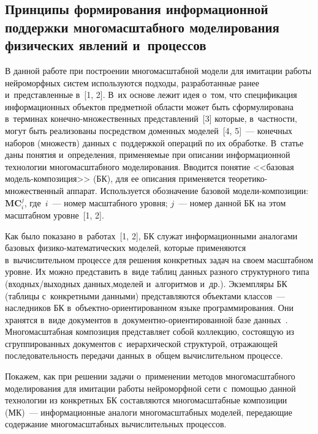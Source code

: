 \begin{multicols}{2}
\section{Принципы формирования информационной поддержки 
многомасштабного моделирования физических явлений 
и~процессов}

    В данной работе при построении многомасштабной модели для имитации 
работы нейроморфных систем используются подходы, разработанные ранее 
и~представленные в~[1, 2]. В~их основе лежит идея о~том, что спецификация 
информационных объектов предметной области может быть сформулирована 
в~терминах 
 ко\-неч\-но-мно\-жест\-вен\-ных представлений~[3] которые, в~част\-ности, могут 
быть реализованы посредством доменных моделей~[4, 5]~--- конечных наборов 
(множеств) данных с~поддержкой операций по их обработке. 
В~\mbox{статье}~\cite{2-ab} даны понятия и~определения, применяемые при описании информационной 
технологии многомасштабного моделирования. Вводится понятие <<базовая 
мод\-ель-ком\-по\-зи\-ция>> (БК), для ее описания применяется 
тео\-ре\-ти\-ко-мно\-жест\-вен\-ный аппарат. Используется обозначение базовой  
мо\-де\-ли-ком\-по\-зи\-ции: $\mathbf{MC}_i^j$, где~$i$~--- номер 
масштабного уровня; $j$~--- номер данной БК на этом масштабном уровне~[1, 
2]. 
    
    Как было показано в~работах~[1, 2], БК служат информационными 
аналогами базовых  
фи\-зи\-ко-ма\-те\-ма\-ти\-че\-ских моделей, которые применяются 
в~вычислительном процессе для решения \mbox{конкретных} задач на своем масштабном 
уровне. Их можно представить в~виде таблиц данных разного структурного типа 
(вход\-ных/вы\-ход\-ных данных,\linebreak моделей и~алгоритмов и~др.). Экземпляры БК 
(таб\-ли\-цы с~конкретными данными) представляются объектами классов~--- 
наследников БК  
в~объект\-но-ори\-ен\-ти\-ро\-ван\-ном языке программирования. Они хранятся 
в~виде документов 
    в~до\-ку\-мент\-но-ори\-ен\-ти\-ро\-ван\-ной базе данных~\cite{6-ab}. 
Многомасштабная композиция представляет собой коллекцию, состоящую из 
сгруппированных документов с~иерархической структурой, отражающей 
последовательность передачи данных в~общем вычислительном процессе.
    
    Покажем, как при решении задачи о~применении методов 
многомасштабного моделирования для имитации работы нейроморфной сети 
с~по\-мощью данной технологии из конкретных БК\linebreak 
 со\-став\-ля\-ют\-ся многомасштабные композиции (МК)~--- информационные 
аналоги многомасштабных моделей, передающие содержание многомасштабных 
вычислительных процессов. 


\end{multicols}
